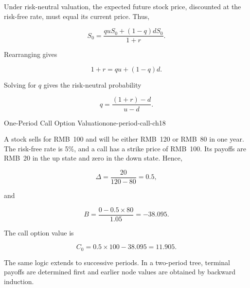 Under risk-neutral valuation, the expected future
stock price, discounted at the risk-free rate, must
equal its current price. Thus,

\begin{equation*}
S_0=\frac{quS_0+(1-q)dS_0}{1+r}.
\end{equation*}

Rearranging gives

\begin{equation*}
1+r=qu+(1-q)d.
\end{equation*}

Solving for $q$ gives the risk-neutral probability

\begin{equation}
q=\frac{(1+r)-d}{u-d}.
\label{eq:ch18-binomial-risk-neutral-probability}
\end{equation}

\begin{example}{One-Period Call Option Valuation}{one-period-call-ch18}

A stock sells for RMB~100 and will be either RMB~120 or RMB~80 in one year. The risk-free rate is 5\%, and a call has a strike price of RMB~100. Its payoffs are RMB~20 in the up state and zero in the down state. Hence,

$$
\Delta=\frac{20}{120-80}=0.5,
$$

and

$$
B=\frac{0-0.5\times 80}{1.05}=-38.095.
$$

The call option value is

$$
C_0=0.5\times 100-38.095=11.905.
$$

\end{example}

The same logic extends to successive periods. In a two-period tree, terminal payoffs are determined first and earlier node values are obtained by backward induction.

